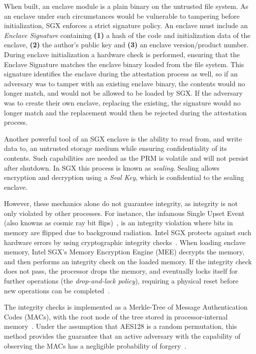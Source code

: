 \documentclass{article}
\begin{document}
			When built, an enclave module is a plain binary on the untrusted file system.
			As an enclave under such circumstances would be vulnerable to tampering before initialization, SGX enforces a strict signature policy.
			An enclave must include an \textit{Enclave Signature} containing \textbf{(1)} a hash of the code and initialization data of the enclave, \textbf{(2)} the author's public key and \textbf{(3)} an enclave version/product number.
			During enclave initialization a hardware check is performed, ensuring that the Enclave Signature matches the enclave binary loaded from the file system.
			This signature identifies the enclave during the attestation process as well, so if an adversary was to tamper with an existing enclave binary, the contents would no longer match, and would not be allowed to be loaded by SGX.
			If the adversary was to create their own enclave, replacing the existing, the signature would no longer match and the replacement would then be rejected during the attestation process.

			Another powerful tool of an SGX enclave is the ability to read from, and write data to, an untrusted storage medium while ensuring confidentiality of its contents.
			Such capabilities are needed as the PRM is volatile and will not persist after shutdown.
			In SGX this process is known as \textit{sealing}.
			Sealing allows encryption and decryption using a \textit{Seal Key}, which is confidential to the sealing enclave.

			However, these mechanics alone do not guarantee integrity, as integrity is not only violated by other processes.
			For instance, the infamous Single Upset Event (also knowns as cosmic ray bit flips)~\cite{normand_single_1996}, is an integrity violation where bits in memory are flipped due to background radiation.
			Intel SGX protects against such hardware errors by using cryptographic integrity checks~\cite{gueron_memory_2016}.
			When loading enclave memory, Intel SGX's Memory Encryption Engine (MEE) decrypts the memory, and then performs an integrity check on the loaded memory.
			If the integrity check does not pass, the processor drops the memory, and eventually locks itself for further operations (the \textit{drop-and-lock policy}), requiring a physical reset before new operations can be completed~\cite{jang_sgx-bomb_2017}.

			The integrity checks is implemented as a Merkle-Tree of Message Authentication Codes (MACs), with the root node of the tree stored in processor-internal memory~\cite{jang_sgx-bomb_2017}.
			Under the assumption that AES128 is a random permutation, this method provides the guarantee that an active adversary with the capability of observing the MACs has a negligible probability of forgery~\cite{gueron_memory_2016}.
\end{document}
